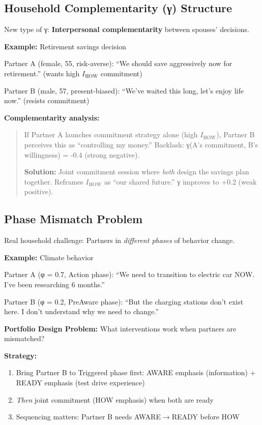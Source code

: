 \subsection{Household Complementarity (γ) Structure}

New type of γ: \textbf{Interpersonal complementarity} between spouses' decisions.

\textbf{Example:} Retirement savings decision

Partner A (female, 55, risk-averse): ``We should save aggressively now for retirement.'' (wants high $I_{\text{HOW}}$ commitment)

Partner B (male, 57, present-biased): ``We've waited this long, let's enjoy life now.'' (resists commitment)

\textbf{Complementarity analysis:}

\begin{quote}
If Partner A launches commitment strategy alone (high $I_{\text{HOW}}$), Partner B perceives this as ``controlling my money.'' Backlash: γ(A's commitment, B's willingness) = -0.4 (strong negative).

\textbf{Solution:} Joint commitment session where \emph{both} design the savings plan together. Reframes $I_{\text{HOW}}$ as ``our shared future.'' γ improves to +0.2 (weak positive).
\end{quote}

\subsection{Phase Mismatch Problem}

Real household challenge: Partners in \emph{different phases} of behavior change.

\textbf{Example:} Climate behavior

Partner A (φ = 0.7, Action phase): ``We need to transition to electric car NOW. I've been researching 6 months.''

Partner B (φ = 0.2, PreAware phase): ``But the charging stations don't exist here. I don't understand why we need to change.''

\textbf{Portfolio Design Problem:} What interventions work when partners are mismatched?

\textbf{Strategy:}
\begin{enumerate}
\item Bring Partner B to Triggered phase first: AWARE emphasis (information) + READY emphasis (test drive experience)
\item \emph{Then} joint commitment (HOW emphasis) when both are ready
\item Sequencing matters: Partner B needs AWARE$\rightarrow$READY before HOW
\end{enumerate}

